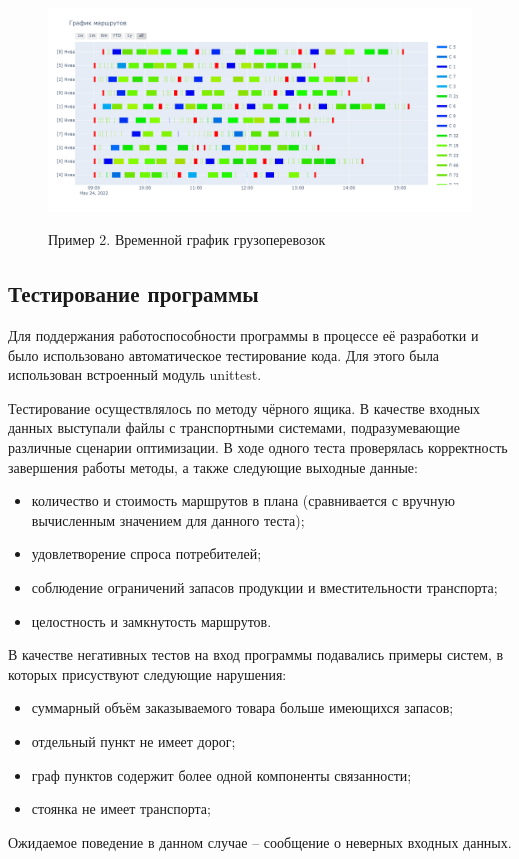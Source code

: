 \begin{figure}[h!]
	\begin{center}
		{\includegraphics[scale=0.4, angle=0, page=1]{img/demo_schedule_2.png}}
		\caption{Пример 2. Временной график грузоперевозок}
		\label{demo:schedule2}
	\end{center}
\end{figure}

\newpage
\subsection{Тестирование программы}
Для поддержания работоспособности программы в процессе её разработки и было использовано автоматическое тестирование кода. Для этого была использован встроенный модуль unittest\cite{libs:unittest}. 

\pagebreak
Тестирование осуществлялось по методу чёрного ящика. В качестве входных данных выступали файлы с транспортными системами, подразумевающие различные сценарии оптимизации. В ходе одного теста проверялась корректность завершения работы методы, а также следующие выходные данные:

\begin{itemize}
	\item количество и стоимость маршрутов в плана (сравнивается с вручную вычисленным значением для данного теста);
	\item удовлетворение спроса потребителей;
	\item соблюдение ограничений запасов продукции и вместительности транспорта;
	\item целостность и замкнутость маршрутов.
\end{itemize}

В качестве негативных тестов на вход программы подавались примеры систем, в которых присуствуют следующие нарушения:
\begin{itemize}
	\item суммарный объём заказываемого товара больше имеющихся запасов;
	\item отдельный пункт не имеет дорог;
	\item граф пунктов содержит более одной компоненты связанности;
	\item стоянка не имеет транспорта;
\end{itemize} 
Ожидаемое поведение в данном случае -- сообщение о неверных входных данных.

